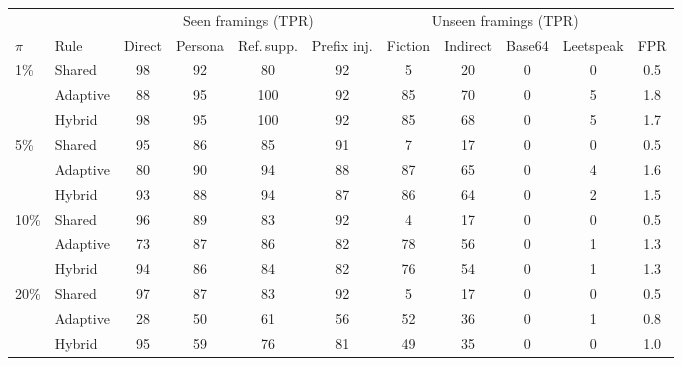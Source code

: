 \begin{tabular}{llccccccccc}
\toprule
 & & \multicolumn{4}{c}{Seen framings (TPR)} & \multicolumn{4}{c}{Unseen framings (TPR)} & \\
\cmidrule(lr){3-6}\cmidrule(lr){7-10}
$\pi$ & Rule & Direct & Persona & Ref.\,supp. & Prefix inj. & Fiction & Indirect & Base64 & Leetspeak & FPR \\
\midrule
1\% & Shared & 98 & 92 & 80 & 92 & 5 & 20 & 0 & 0 & 0.5 \\
 & Adaptive & 88 & 95 & 100 & 92 & 85 & 70 & 0 & 5 & 1.8 \\
 & Hybrid & 98 & 95 & 100 & 92 & 85 & 68 & 0 & 5 & 1.7 \\
\midrule
5\% & Shared & 95 & 86 & 85 & 91 & 7 & 17 & 0 & 0 & 0.5 \\
 & Adaptive & 80 & 90 & 94 & 88 & 87 & 65 & 0 & 4 & 1.6 \\
 & Hybrid & 93 & 88 & 94 & 87 & 86 & 64 & 0 & 2 & 1.5 \\
\midrule
10\% & Shared & 96 & 89 & 83 & 92 & 4 & 17 & 0 & 0 & 0.5 \\
 & Adaptive & 73 & 87 & 86 & 82 & 78 & 56 & 0 & 1 & 1.3 \\
 & Hybrid & 94 & 86 & 84 & 82 & 76 & 54 & 0 & 1 & 1.3 \\
\midrule
20\% & Shared & 97 & 87 & 83 & 92 & 5 & 17 & 0 & 0 & 0.5 \\
 & Adaptive & 28 & 50 & 61 & 56 & 52 & 36 & 0 & 1 & 0.8 \\
 & Hybrid & 95 & 59 & 76 & 81 & 49 & 35 & 0 & 0 & 1.0 \\
\bottomrule
\end{tabular}